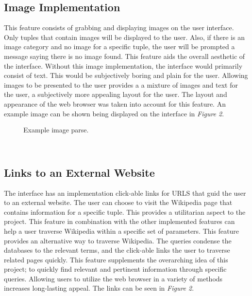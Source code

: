 \documentclass{sig-alternate-05-2015}
\begin{document}
\subsection{Image Implementation}
 This feature consists of grabbing and displaying images on the user interface.  Only tuples that contain images will be displayed to the user. Also, if there is an image category and no image for a specific tuple, the user will be prompted a message saying there is no image found. This feature aids the overall aesthetic of the interface. Without this image implementation, the interface would primarily consist of text. This would be subjectively boring and plain for the user. Allowing images to be presented to the user provides a a mixture of images and text for the user, a subjectively more appealing layout for the user. The layout and appearance of the web browser was taken into account for this feature. An example image can be shown being displayed on the interface in \textit{Figure 2}. 
 ~
\begin{figure}[h]
\center
{}
\caption{Example image parse.}
\center
\end{figure}
~
 
\subsection{Links to an External Website}
The interface has an implementation click-able links for URLS that guid the user to an external website. The user can choose to visit the Wikipedia page that contains information for a specific tuple. This provides a utilitarian aspect to the project. This feature in combination with the other implemented features can help a user traverse Wikipedia within a specific set of parameters. This feature provides an alternative way to traverse Wikipedia. The queries condense the databases to the relevant terms, and the click-able links the user to traverse related pages quickly. This feature supplements the overarching idea of this project; to quickly find relevant and pertinent information through specific queries. Allowing users to utilize the web browser in a variety of methods increases long-lasting appeal. The links can be seen in \textit{Figure 2}.  
 
\end{document}
